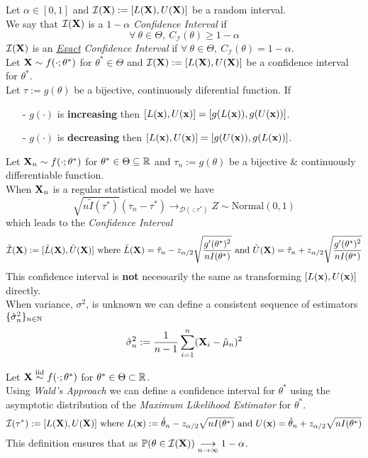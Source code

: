 \documentclass[11pt,a4paper]{article}
\begin{document}
Let $\alpha\in[0,1]$ and $\mathcal{I}(\textbf{X}):=[L(\textbf{X}),U(\textbf{X})]$ be a random interval.\\
We say that $\mathcal{I}(\textbf{X})$ is a $1-\alpha$ \textit{Confidence Interval} if
$$\forall\ \theta\in\Theta,\ C_\mathcal{I}(\theta)\geq1-\alpha$$
\nb $\mathcal{I}(\textbf{X})$ is an \textit{\underline{Exact} Confidence Interval} if $\forall\ \theta\in\Theta,\ C_\mathcal{I}(\theta)=1-\alpha$.\\

Let $\textbf{X}\sim f(\cdot;\theta^*)$ for $\theta^*\in\Theta$ and $\mathcal{I}(\textbf{X}):=[L(\textbf{X}),U(\textbf{X})]$ be a confidence interval for $\theta^*$.\\
Let $\tau:=g(\theta)$ be a bijective, continuously diferential function. If
\begin{itemize}
	\item[-] $g(\cdot)$ is \textbf{increasing} then $[L(\textbf{x}),U(\textbf{x})]=[g(L(\textbf{x})),g(U(\textbf{x}))]$.
	\item[-] $g(\cdot)$ is \textbf{decreasing} then $[L(\textbf{x}),U(\textbf{x})]=[g(U(\textbf{x})),g(L(\textbf{x}))]$.
\end{itemize}

Let $\textbf{X}_n\sim f(\cdot;\theta^*)$ for $\theta^*\in\Theta\subseteq\mathbb{R}$ and $\tau_n:=g(\theta)$ be a bijective \& continuously differentiable function.\\
When $\textbf{X}_n$ is a regular statistical model we have
$$\sqrt{n\tilde{I}(\tau^*)}(\hat\tau_n-\tau^*)\to_{\mathcal{D}(\cdot;\tau^*)}Z\sim\text{Normal}(0,1)$$
which leads to the \textit{Confidence Interval}
$$\tilde{\mathcal{I}}(\textbf{X}):=[\tilde{L}(\textbf{X}),\tilde{U}(\textbf{X})]\text{ where }\tilde{L}(\textbf{X})=\hat\tau_n-z_{\alpha/2}\sqrt{\dfrac{g'(\theta^*)^2}{nI(\theta^*)}}\text{ and }\tilde{U}(\textbf{X})=\hat\tau_n+z_{\alpha/2}\sqrt{\dfrac{g'(\theta^*)^2}{nI(\theta^*)}}$$
\nb This confidence interval is \textbf{not} necessarily the same as transforming $[L(\textbf{x}),U(\textbf{x})]$ directly.\\

When variance, $\sigma^2$, is unknown we can define a consistent sequence of estimators $\{\hat\sigma^2_n\}_{n\in\mathbb{N}}$ 
$$\hat\sigma_n^2:=\frac{1}{n-1}\sum_{i=1}^n(\textbf{X}_i-\hat\mu_n)^2$$

Let $\textbf{X}\overset{\text{iid}}{\sim} f(\cdot;\theta^*)$ for $\theta^*\in\Theta\subset\mathbb{R}$.\\
Using \textit{Wald's Approach} we can define a confidence interval for $\theta^*$ using the asymptotic distribution of the \textit{Maximum Likelihood Estimator} for $\theta^*$.
$$\mathcal{I}(\tau^*):=[L(\textbf{X}),U(\textbf{X})]\text{ where } L(\textbf{x}):=\hat\theta_n-z_{\alpha/2}\sqrt{nI(\theta^*)}\text{ and }U(\textbf{x})=\hat\theta_n+z_{\alpha/2}\sqrt{nI(\theta^*)}$$
\nb This definition ensures that as $\mathbb{P}(\theta\in\mathcal{I}(\textbf{X}))\underset{n\to\infty}{\longrightarrow}1-\alpha$.\\
\end{document}
